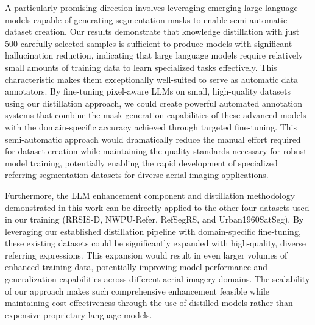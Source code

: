 A particularly promising direction involves leveraging emerging large language models capable of generating segmentation masks to enable semi-automatic dataset creation. Our results demonstrate that knowledge distillation with just 500 carefully selected samples is sufficient to produce models with significant hallucination reduction, indicating that large language models require relatively small amounts of training data to learn specialized tasks effectively. This characteristic makes them exceptionally well-suited to serve as automatic data annotators. By fine-tuning pixel-aware LLMs on small, high-quality datasets using our distillation approach, we could create powerful automated annotation systems that combine the mask generation capabilities of these advanced models with the domain-specific accuracy achieved through targeted fine-tuning. This semi-automatic approach would dramatically reduce the manual effort required for dataset creation while maintaining the quality standards necessary for robust model training, potentially enabling the rapid development of specialized referring segmentation datasets for diverse aerial imaging applications.

Furthermore, the LLM enhancement component and distillation methodology demonstrated in this work can be directly applied to the other four datasets used in our training (RRSIS-D, NWPU-Refer, RefSegRS, and Urban1960SatSeg). By leveraging our established distillation pipeline with domain-specific fine-tuning, these existing datasets could be significantly expanded with high-quality, diverse referring expressions. This expansion would result in even larger volumes of enhanced training data, potentially improving model performance and generalization capabilities across different aerial imagery domains. The scalability of our approach makes such comprehensive enhancement feasible while maintaining cost-effectiveness through the use of distilled models rather than expensive proprietary language models.

